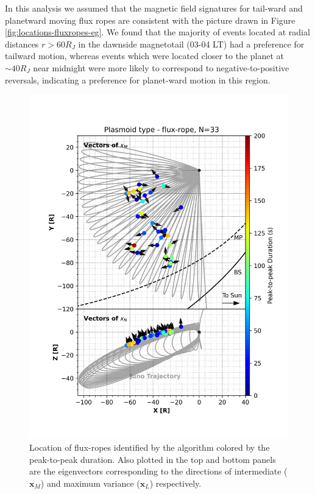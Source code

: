 In this analysis we assumed that the magnetic field signatures for tail-ward and planetward moving flux ropes are consistent with the picture drawn in Figure \ref{fig:locations-fluxropes-eg}. We found that the majority of events located at radial distances $r > 60 R_J$ in the dawnside magnetotail (03-04 LT) had a preference for tailward motion, whereas events which were located closer to the planet at $\sim40 R_J$ near midnight were more likely to correspond to negative-to-positive reversals, indicating a preference for planet-ward motion in this region. 

\begin{figure}
    \centering
    \includegraphics{images6/TrajectoryLocationofEvent_quiver_flux-rope.png}
    \caption{Location of flux-ropes identified by the algorithm colored by the peak-to-peak duration. Also plotted in the top and bottom panels are the eigenvectors corresponding to the directions of intermediate ($\mathbf{x}_M$) and maximum variance ($\mathbf{x}_L$) respectively.}
    \label{fig:trajectory-quiver-fluxropes}
\end{figure}

